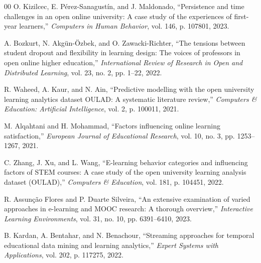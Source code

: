 \documentclass[conference]{IEEEtran}
\begin{document}
\begin{thebibliography}{00}
 O. Kizilcec, E. Pérez-Sanagustín, and J. Maldonado, ``Persistence and time challenges in an open online university: A case study of the experiences of first-year learners,'' \textit{Computers in Human Behavior}, vol. 146, p. 107801, 2023.

 A. Bozkurt, N. Akgün-Özbek, and O. Zawacki-Richter, ``The tensions between student dropout and flexibility in learning design: The voices of professors in open online higher education,'' \textit{International Review of Research in Open and Distributed Learning}, vol. 23, no. 2, pp. 1--22, 2022.

 R. Waheed, A. Kaur, and N. Ain, ``Predictive modelling with the open university learning analytics dataset OULAD: A systematic literature review,'' \textit{Computers \& Education: Artificial Intelligence}, vol. 2, p. 100011, 2021.

 M. Alqahtani and H. Mohammad, ``Factors influencing online learning satisfaction,'' \textit{European Journal of Educational Research}, vol. 10, no. 3, pp. 1253--1267, 2021.

 C. Zhang, J. Xu, and L. Wang, ``E-learning behavior categories and influencing factors of STEM courses: A case study of the open university learning analysis dataset (OULAD),'' \textit{Computers \& Education}, vol. 181, p. 104451, 2022.

 R. Assunção Flores and P. Duarte Silveira, ``An extensive examination of varied approaches in e-learning and MOOC research: A thorough overview,'' \textit{Interactive Learning Environments}, vol. 31, no. 10, pp. 6391--6410, 2023.

 B. Kardan, A. Bentahar, and N. Benachour, ``Streaming approaches for temporal educational data mining and learning analytics,'' \textit{Expert Systems with Applications}, vol. 202, p. 117275, 2022.

\end{thebibliography}
\end{document}
